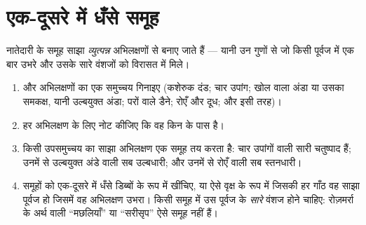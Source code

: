 \section{एक-दूसरे में धँसे समूह}

\begin{method}[साझा अभिलक्षणों से समूह बनाना]\label{met:g10:common-ancestry:grouping}
नातेदारी के समूह साझा \emph{व्युत्पन्न} अभिलक्षणों से बनाए जाते हैं ---
यानी उन गुणों से जो किसी पूर्वज में एक बार उभरे और उसके सारे वंशजों को
विरासत में मिले।
\begin{enumerate}
  \item {} और अभिलक्षणों का एक समुच्चय गिनाइए (कशेरुक दंड; चार
        उपांग; खोल वाला अंडा या उसका समकक्ष, यानी उल्बयुक्त अंडा; परों
        वाले डैने; रोएँ और दूध; और इसी तरह)।
  \item हर अभिलक्षण के लिए नोट कीजिए कि वह किन  के पास है।
  \item किसी उपसमुच्चय का साझा अभिलक्षण एक समूह तय करता है: चार उपांगों
        वाली सारी  चतुष्पाद हैं; उनमें से उल्बयुक्त अंडे वाली
        सब उल्बधारी; और उनमें से रोएँ वाली सब स्तनधारी।
  \item समूहों को एक-दूसरे में धँसे डिब्बों के रूप में खींचिए, या ऐसे
        वृक्ष के रूप में जिसकी हर गाँठ वह साझा पूर्वज हो जिसमें वह
        अभिलक्षण उभरा। किसी समूह में उस पूर्वज के \emph{सारे} वंशज होने
        चाहिए: रोज़मर्रा के अर्थ वाली ``मछलियाँ'' या ``सरीसृप'' ऐसे समूह
        नहीं हैं।
\end{enumerate}
\end{method}

